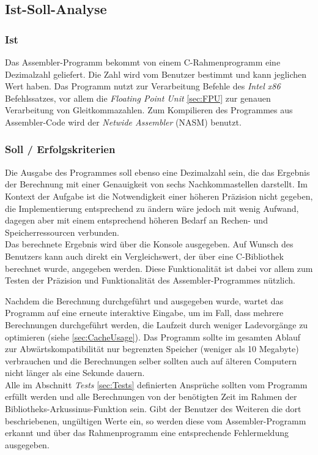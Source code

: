 \documentclass{article}
\begin{document}
	\subsection{Ist-Soll-Analyse}
		\subsubsection{Ist}
			Das Assembler-Programm bekommt von einem C-Rahmenprogramm eine Dezimalzahl geliefert. Die Zahl wird vom Benutzer bestimmt und kann jeglichen Wert haben. Das Programm nutzt zur Verarbeitung Befehle des \emph{Intel x86} Befehlssatzes, vor allem die \emph{Floating Point Unit} \ref{sec:FPU} zur genauen Verarbeitung von Gleitkommazahlen. Zum Kompilieren des Programmes aus Assembler-Code wird der \emph{Netwide Assembler} (NASM) benutzt.\\

		\subsubsection{Soll / Erfolgskriterien}
			Die Ausgabe des Programmes soll ebenso eine Dezimalzahl sein, die das Ergebnis der Berechnung mit einer Genauigkeit von sechs Nachkommastellen darstellt. Im Kontext der Aufgabe ist die Notwendigkeit einer höheren Präzision nicht gegeben, die Implementierung entsprechend zu ändern wäre jedoch mit wenig Aufwand, dagegen aber mit einem entsprechend höheren Bedarf an Rechen- und Speicherressourcen verbunden.\\
			Das berechnete Ergebnis wird über die Konsole ausgegeben. Auf Wunsch des Benutzers kann auch direkt ein Vergleichswert, der über eine C-Bibliothek berechnet wurde, angegeben werden. Diese Funktionalität ist dabei vor allem zum Testen der Präzision und Funktionalität des Assembler-Programmes nützlich.

			Nachdem die Berechnung durchgeführt und ausgegeben wurde, wartet das Programm auf eine erneute interaktive Eingabe, um im Fall, dass mehrere Berechnungen durchgeführt werden, die Laufzeit durch weniger Ladevorgänge zu optimieren (siehe \ref{sec:CacheUsage}). Das Programm sollte im gesamten Ablauf zur Abwärts\-kompatibilität nur begrenzten Speicher (weniger als 10 Megabyte) verbrauchen und die Berechnungen selber sollten auch auf älteren Computern nicht länger als eine Sekunde dauern.\\
			Alle im Abschnitt \emph{Tests} \ref{sec:Tests} definierten Ansprüche sollten vom Programm erfüllt werden und alle Berechnungen von der benötigten Zeit im Rahmen der Bibliotheks-Arkussinus-Funktion sein. Gibt der Benutzer des Weiteren die dort beschriebenen, ungültigen Werte ein, so werden diese vom Assembler-Programm erkannt und über das Rahmenprogramm eine entsprechende Fehlermeldung ausgegeben.
\end{document}
